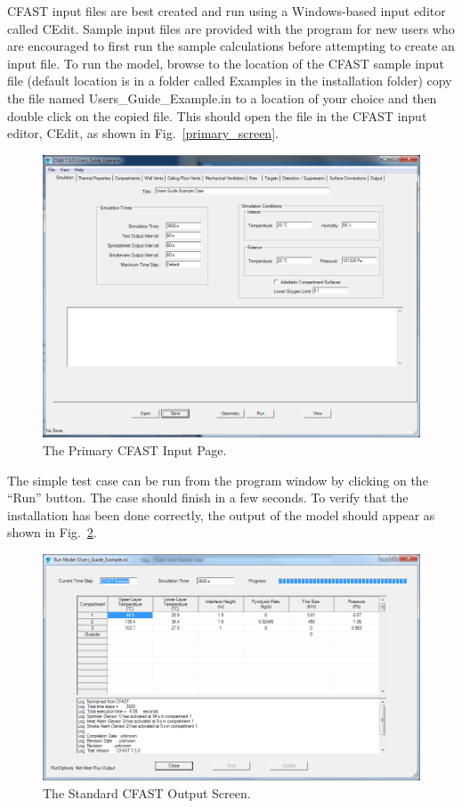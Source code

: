 CFAST input files are best created and run using a Windows-based input editor called CEdit. Sample input files are provided with the program for new users who are encouraged to first run the sample calculations before attempting to create an input file. To run the model, browse to the location of the CFAST sample input file (default location is in a folder called {\ct Examples} in the installation folder) copy the file named {\ct Users\_Guide\_Example.in} to a location of your choice and then double click on the copied file. This should open the file in the CFAST input editor, CEdit, as shown in Fig.~\ref{primary_screen}.
\begin{figure}[h!]
\includegraphics[width=6.5in]{FIGURES/Environment_Tab}
\caption[The Primary CFAST Input Page]{The Primary CFAST Input Page.}
\label{primary_screen}
\label{Figure 1.1}
\end{figure}
The simple test case can be run from the program window by clicking on the ``Run'' button. The case should finish in a few seconds. To verify that the installation has been done correctly, the output of the model should appear as shown in Fig.~\ref{Run_Model}.
\begin{figure}[h!]
\includegraphics[width=6.5in]{FIGURES/Standard_Output}
\caption[The Standard CFAST Output Screen]{The Standard CFAST Output Screen.}
\label{Run_Model}
\end{figure}


